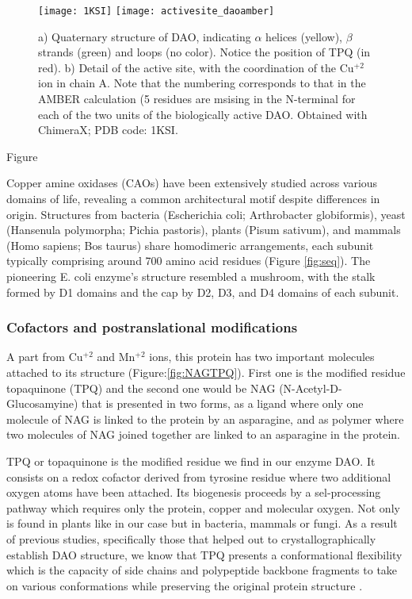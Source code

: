 \documentclass[a4paper]{article}
\begin{document}
\begin{figure}[h]
    \centering
    \texttt{[image: 1KSI]}
    \texttt{[image: activesite\_daoamber]}
    \caption{a) Quaternary structure of DAO, indicating $\alpha$ helices (yellow), $\beta$ strands (green) and loops (no color). Notice the position of TPQ (in red). b) Detail of the active site, with the coordination of the Cu$^{+2}$ ion in chain A. Note that the numbering corresponds to that in the AMBER calculation (5 residues are msising in the N-terminal for each of the two units of the biologically active DAO. Obtained with ChimeraX; PDB code: 1KSI.}
\label{fig:structure}
\end{figure}

Figure 




Copper amine oxidases (CAOs) have been extensively studied across various domains of life\cite{mcgrath_structure_2009}, revealing a common architectural motif despite differences in origin. Structures from bacteria (Escherichia coli; Arthrobacter globiformis), yeast (Hansenula polymorpha; Pichia pastoris), plants (Pisum sativum), and mammals (Homo sapiens; Bos taurus) share homodimeric arrangements\cite{floris_copper_2009}, each subunit typically comprising around 700 amino acid residues (Figure \ref{fig:seq}). The pioneering E. coli enzyme's structure\cite{parsons_crystal_1995} resembled a mushroom, with the stalk formed by D1 domains and the cap by D2, D3, and D4 domains of each subunit. 

\subsubsection{Cofactors and postranslational modifications}

A part from Cu$^{+2}$ and Mn$^{+2}$  ions, this protein has two important molecules attached to its structure (Figure:\ref{fig:NAGTPQ}). First one is the modified residue topaquinone (TPQ) and the second one would be NAG (N-Acetyl-D-Glucosamyine) that is presented in two forms, as a ligand where only one molecule of NAG is linked to the protein by an asparagine, and as polymer where two molecules of NAG joined together are linked to an asparagine in the protein.

TPQ or topaquinone is the modified residue we find in our enzyme DAO. It consists on a redox cofactor derived from tyrosine residue where two additional oxygen atoms have been attached. Its biogenesis proceeds by a sel-processing pathway which requires only the protein, copper and molecular oxygen. Not only is found in plants like in our case but in bacteria, mammals or fungi.
As a result of previous studies, specifically those that helped out to crystallographically establish DAO structure, we know that TPQ presents a conformational flexibility which is the capacity of side chains and polypeptide backbone fragments to take on various conformations while preserving the original protein structure \cite{1ksi}.
\end{document}
